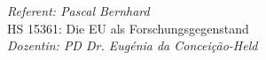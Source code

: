 \documentclass[11pt,a4paper,ngerman]{report}
\begin{document}
 
 	\begin{flushright}
 			{\scriptsize \textcolor{dunkelgrau.60}{\emph{Referent: Pascal Bernhard}\\
 							HS 15361: Die EU als Forschungsgegenstand\\
 							\emph{Dozentin: PD Dr. Eug\'{e}nia da Concei\c{c}\~{a}o-Held}}}
 	\end{flushright}						

\vspace{0.3cm}
	

	\begin{center}
			{}
	\end{center} 	

	
\vspace{0.5cm} 
		
\end{document}
